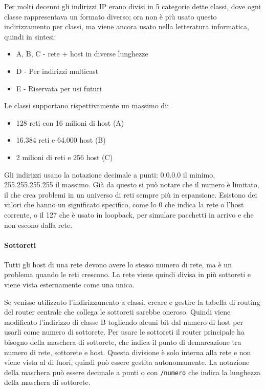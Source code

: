 Per molti decenni gli indirizzi IP erano divisi in 5 categorie dette classi, dove ogni classe rappresentava un formato diverso;
ora non è più usato questo indirizzamento per classi, ma viene ancora usato nella letteratura informatica, quindi in sintesi:
\begin{itemize}
\item A, B, C - rete + host in diverse lunghezze 
\item D - Per indirizzi multicast
\item E - Riservata per usi futuri
\end{itemize}
Le classi supportano rispettivamente un massimo di:
\begin{itemize}
\item 128 reti con 16 milioni di host (A)
\item 16.384 reti e 64.000 host (B)
\item 2 milioni di reti e 256 host (C)
\end{itemize}

Gli indirizzi usano la notazione decimale a punti: 0.0.0.0 il minimo, 255.255.255.255 il massimo.
Già da questo si può notare che il numero è limitato, il che crea problemi in un universo di reti sempre più in espansione.
Esistono dei valori che hanno un significato specifico, come lo 0 che indica la rete o l'host corrente, o il 127 che è usato in loopback, per simulare pacchetti in arrivo e che non escono dalla rete.

\paragraph{Sottoreti}
Tutti gli host di una rete devono avere lo stesso numero di rete, ma è un problema quando le reti crescono.
La rete viene quindi divisa in più sottoreti e viene vista esternamente come una unica.

Se venisse utilizzato l'indirizzamento a classi, creare e gestire la tabella di routing del router centrale che collega le sottoreti sarebbe oneroso.
Quindi viene modificato l'indirizzo di classe B togliendo alcuni bit dal numero di host per usarli come numero di sottorete. 
Per usare le sottoreti il router principale ha bisogno della maschera di sottorete, che indica il punto di demarcazione tra numero di rete, sottorete e host. 
Questa divisione è solo interna alla rete e non viene vista al di fuori, quindi può essere gestita autonomamente.
La notazione della maschera può essere decimale a punti o con \texttt{/numero} che indica la lunghezza della maschera di sottorete.

